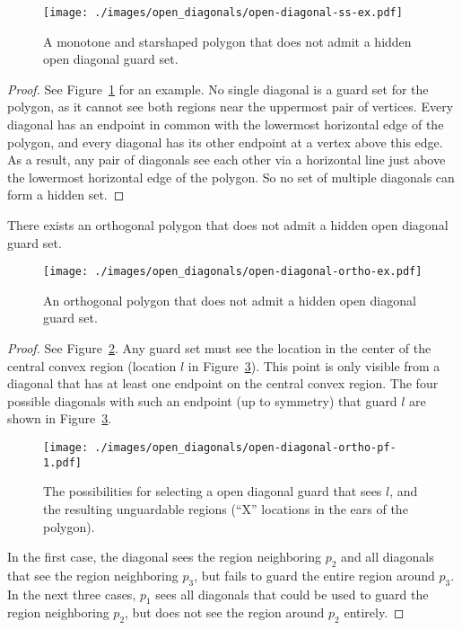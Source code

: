 \documentclass{cccg12}
\begin{document}
\begin{figure}[ht]
\centering
\texttt{[image: ./images/open\_diagonals/open-diagonal-ss-ex.pdf]}
\caption{A monotone and starshaped polygon that does not admit a hidden open diagonal guard set.}
\label{fig:open-diagonal-ss-ex}
\end{figure}

\begin{proof}
See Figure~\ref{fig:open-diagonal-ss-ex} for an example.
No single diagonal is a guard set for the polygon, as it cannot see both regions near the uppermost pair of vertices.
Every diagonal has an endpoint in common with the lowermost horizontal edge of the polygon, and every diagonal has its other endpoint at a vertex above this edge.
As a result, any pair of diagonals see each other via a horizontal line just above the lowermost horizontal edge of the polygon.
So no set of multiple diagonals can form a hidden set.
\end{proof}

\begin{lemma}
There exists an orthogonal polygon that does not admit a hidden open diagonal guard set.
\end{lemma}

\begin{figure}[ht]
\centering
\texttt{[image: ./images/open\_diagonals/open-diagonal-ortho-ex.pdf]}
\caption{An orthogonal polygon that does not admit a hidden open diagonal guard set.}
\label{fig:open-diagonal-ortho-ex}
\end{figure}

\begin{proof}
See Figure~\ref{fig:open-diagonal-ortho-ex}.
Any guard set must see the location in the center of the central convex region (location $l$ in Figure~\ref{fig:open-diagonal-ortho-pf-1}).
This point is only visible from a diagonal that has at least one endpoint on the central convex region.
The four possible diagonals with such an endpoint (up to symmetry) that guard $l$ are shown in Figure~\ref{fig:open-diagonal-ortho-pf-1}.

\begin{figure}[ht]
\centering
\texttt{[image: ./images/open\_diagonals/open-diagonal-ortho-pf-1.pdf]}
\caption{The possibilities for selecting a open diagonal guard that sees $l$, and the resulting unguardable regions (``X'' locations in the ears of the polygon).}
\label{fig:open-diagonal-ortho-pf-1}
\end{figure}

In the first case, the diagonal sees the region neighboring $p_2$ and all diagonals that see the region neighboring $p_3$, but fails to guard the entire region around $p_3$.
In the next three cases, $p_1$ sees all diagonals that could be used to guard the region neighboring $p_2$, but does not see the region around $p_2$ entirely.
\end{proof}
\end{document}

